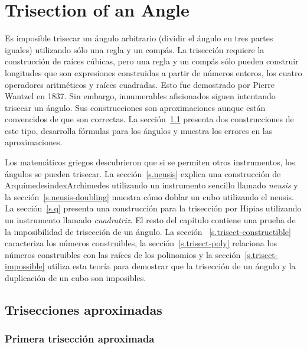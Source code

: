 
\chapter{Trisection of an Angle}\label{c.trisect}


Es imposible trisecar un ángulo arbitrario (dividir el ángulo en tres partes iguales) utilizando sólo una regla y un compás. La trisección requiere la construcción de raíces cúbicas, pero una regla y un compás sólo pueden construir longitudes que son expresiones construidas a partir de números enteros, los cuatro operadores aritméticos y raíces cuadradas. Esto fue demostrado por Pierre Wantzel en 1837. Sin embargo, innumerables aficionados siguen intentando trisecar un ángulo. Sus construcciones son aproximaciones aunque están convencidos de que son correctas. La sección~\ref{s.trisect-approx} presenta dos construcciones de este tipo, desarrolla fórmulas para los ángulos y muestra los errores en las aproximaciones.

Los matemáticos griegos descubrieron que si se permiten otros instrumentos, los ángulos se pueden trisecar. La sección~\ref{s.neusis} explica una construcción de Arquímedesindex{Archimedes} utilizando un instrumento sencillo llamado \emph{neusis} y la sección~\ref{s.neusis-doubling} muestra cómo doblar un cubo utilizando el neusis. La sección~\ref{s.q} presenta una construcción para la trisección por Hipias utilizando un instrumento llamado \emph{cuadratriz}. El resto del capítulo contiene una prueba de la imposibilidad de trisección de un ángulo. La sección ~\ref{s.trisect-constructible} caracteriza los números construibles, la sección~\ref{s.trisect-poly} relaciona los números construibles con las raíces de los polinomios y la sección~\ref{s.trisect-impossible} utiliza esta teoría para demostrar que la trisección de un ángulo y la duplicación de un cubo son imposibles.


\section{Trisecciones aproximadas}\label{s.trisect-approx}

\subsection{Primera trisección aproximada}\label{sub.trisect-approx1}

